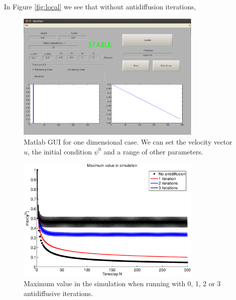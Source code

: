 \documentclass[10pt, a4paper]{article}
\begin{document}
In Figure \ref{fig:local} we see that without antidiffusion iterations, 

\begin{figure}
\centering
 \includegraphics[width=0.8\textwidth]{1dscreenshot.png}
 \caption{Matlab GUI for one dimensional case. We can set the velocity vector $u$, the initial condition $\psi^0$ and a range of other parameters.}
 \label{fig:1dgui}
\end{figure}

\begin{figure}
\centering
 \includegraphics[width=0.8\textwidth]{maxs}
 \caption{Maximum value in the simulation when running with 0, 1, 2 or 3 antidiffusive iterations.}
 \label{fig:maxs}
\end{figure}
\end{document}
